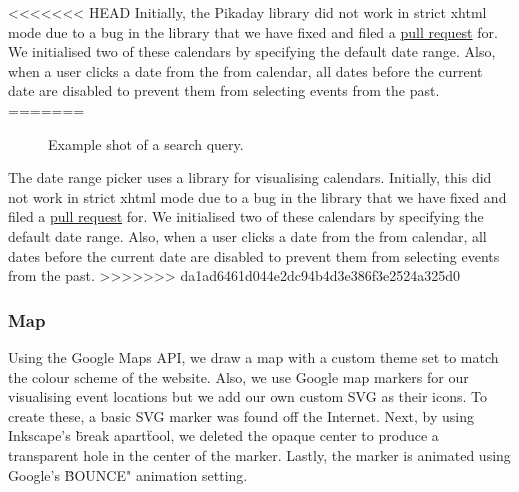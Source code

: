 \documentclass[10pt]{article}
\begin{document}
<<<<<<< HEAD
                Initially, the Pikaday library did not work in strict xhtml mode due to a bug in the library that we have fixed and filed a \href{https://github.com/dbushell/Pikaday/pull/526}{pull request} for. We initialised two of these calendars by specifying the default date range. Also, when a user clicks a date from the from calendar, all dates before the current date are disabled to prevent them from selecting events from the past.
=======
                \begin{figure}[!ht]
                  \centering
                  \caption{Example shot of a search query.}
                \end{figure}

                The date range picker uses a library for visualising calendars. Initially, this did not work in strict xhtml mode due to a bug in the library that we have fixed and filed a \href{https://github.com/dbushell/Pikaday/pull/526}{pull request} for. We initialised two of these calendars by specifying the default date range. Also, when a user clicks a date from the from calendar, all dates before the current date are disabled to prevent them from selecting events from the past.
>>>>>>> da1ad6461d044e2dc94b4d3e386f3e2524a325d0

            \subsubsection{Map}
                Using the Google Maps API, we draw a map with a custom theme set to match the colour scheme of the  website. Also, we use Google map markers for our visualising event locations but we add our own custom SVG as their icons. To create these, a basic SVG marker was found off the Internet. Next, by using Inkscape's \"break apart\" tool, we deleted the opaque center to produce a transparent hole in the center of the marker. Lastly, the  marker is animated using Google's \"BOUNCE" animation setting.
\end{document}
